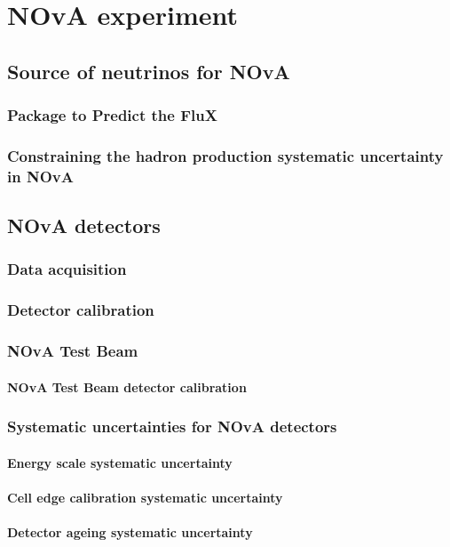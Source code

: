\chapter{NOvA experiment}\label{chapterNOvA}


\section{Source of neutrinos for NOvA}

\subsection{Package to Predict the FluX}

\subsection{Constraining the hadron production systematic uncertainty in NOvA}

\section{NOvA detectors}

\subsection{Data acquisition}

\subsection{Detector calibration}

\subsection{NOvA Test Beam}

\subsubsection{NOvA Test Beam detector calibration}

\subsection{Systematic uncertainties for NOvA detectors}

\subsubsection{Energy scale systematic uncertainty}

\subsubsection{Cell edge calibration systematic uncertainty}

\subsubsection{Detector ageing systematic uncertainty}
